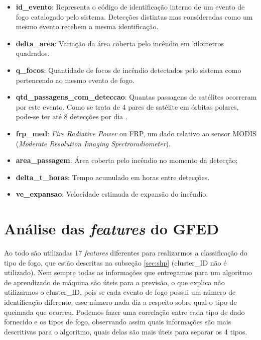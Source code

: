 \begin{multicols}{2}
    


\begin{itemize}
\item \textbf{id\_evento}: Representa o código de identificação interno de um evento de fogo catalogado pelo sistema. Detecções distintas mas consideradas como um mesmo evento recebem a mesma identificação.
\item \textbf{delta\_area}: Variação da área coberta pelo incêndio em kilometros quadrados.
\item \textbf{q\_focos}: Quantidade de focos de incêndio detectados pelo sistema como pertencendo ao mesmo evento de fogo.
\item \textbf{qtd\_passagens\_com\_deteccao}: Quantas passagens de satélites ocorreram por este evento. Como se trata de 4 pares de satélite em órbitas polares, pode-se ter até 8 detecções por dia \cite{painel-fogo}.
\item \textbf{frp\_med}: \textit{Fire Radiative Power} ou FRP, um dado relativo ao sensor MODIS (\textit{Moderate Resolution Imaging Spectroradiometer}).
\item \textbf{area\_passagem}: Área coberta pelo incêndio no momento da detecção;
\item \textbf{delta\_t\_horas}: Tempo acumulado em horas entre detecções.
\item \textbf{ve\_expansao}: Velocidade estimada de expansão do incêndio.

\end{itemize}

\end{multicols}

\section{Análise das \textit{features} do GFED}


Ao todo são utilizadas 17 \textit{features} diferentes para realizarmos a classificação do tipo de fogo, que estão descritas na subseção \ref{sec:shp} (cluster\_ID não é utilizado). Nem sempre todas as informações que entregamos para um algoritmo de aprendizado de máquina são úteis para a previsão, o que explica não utilizarmos o cluster\_ID, pois se cada evento de fogo possui um número de identificação diferente, esse número nada diz a respeito sobre qual o tipo de queimada que ocorreu. Podemos fazer uma correlação entre cada tipo de dado fornecido e os tipos de fogo, observando assim quais informações são mais descritivas para o algoritmo, quais delas são mais úteis para separar os 4 tipos.

